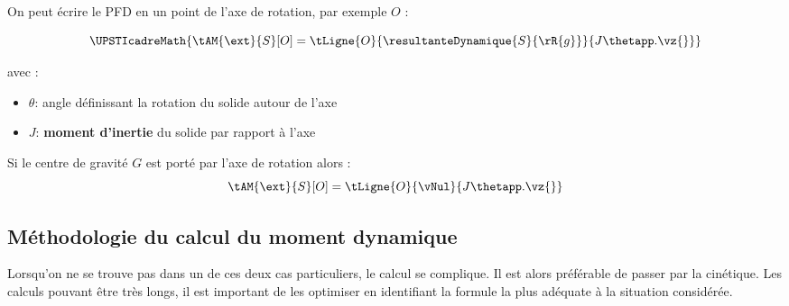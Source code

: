 \documentclass[11pt]{article}
\begin{document}
On peut écrire le PFD en un point de l'axe de rotation, par exemple $O$ :

\[ \UPSTIcadreMath{\tAM{\ext}{S}[O]=\tLigne{O}{\resultanteDynamique{S}{\rR{g}}}{J\thetapp.\vz{}}}\]

\begin{minipage}[c]{0.4\linewidth}
avec :	   
\begin{itemize}
\item $\theta$: angle définissant la rotation du solide  autour de l'axe 
\item $J$: \textbf{moment d'inertie} du solide  par rapport à l'axe 
\end{itemize}
\end{minipage} \hfill
\begin{minipage}[c]{.5\linewidth}
	\centering
{}
\end{minipage} 

\vspace{1em}
Si le centre de gravité $G$ est porté par l'axe de rotation alors : 
\[\tAM{\ext}{S}[O]=\tLigne{O}{\vNul}{J\thetapp.\vz{}}\]

\newpage
\subsection{Méthodologie du calcul du moment dynamique}

Lorsqu'on ne se trouve pas dans un de ces deux cas particuliers, le calcul se complique. Il est alors préférable de passer par la cinétique. Les calculs pouvant être très longs, il est important de les optimiser en identifiant la formule la plus adéquate à la situation considérée.
\end{document}
